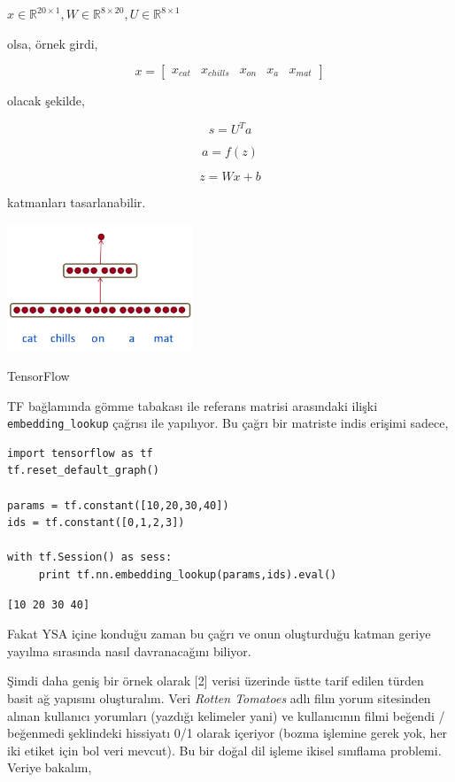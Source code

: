 \documentclass[12pt,fleqn]{article}\usepackage{../../common}
\begin{document}
$x \in \mathbb{R}^{20 \times 1}, 
W \in \mathbb{R}^{8 \times 20}, 
U \in \mathbb{R}^{8 \times 1}$ 

olsa, örnek girdi,

$$ x = \left[\begin{array}{rrrrr}
x_{cat} & x_{chills} & x_{on} & x_{a} & x_{mat}
\end{array}\right]$$

olacak şekilde, 

$$ s = U^T a$$

$$ a = f(z)$$

$$ z = Wx + b$$

katmanları tasarlanabilir.

\includegraphics[width=15em]{nlp_05.png}

TensorFlow 

TF bağlamında gömme tabakası ile referans matrisi arasındaki ilişki
\verb!embedding_lookup! çağrısı ile yapılıyor. Bu çağrı bir matriste indis
erişimi sadece,

\begin{verbatim}
import tensorflow as tf
tf.reset_default_graph()

params = tf.constant([10,20,30,40])
ids = tf.constant([0,1,2,3])

with tf.Session() as sess:
     print tf.nn.embedding_lookup(params,ids).eval()
\end{verbatim}

\begin{verbatim}
[10 20 30 40]
\end{verbatim}

Fakat YSA içine konduğu zaman bu çağrı ve onun oluşturduğu katman geriye
yayılma sırasında nasıl davranacağını biliyor. 

Şimdi daha geniş bir örnek olarak [2] verisi üzerinde üstte tarif edilen
türden basit ağ yapısını oluşturalım. Veri {\em Rotten Tomatoes} adlı film
yorum sitesinden alınan kullanıcı yorumları (yazdığı kelimeler yani) ve
kullanıcının filmi beğendi / beğenmedi şeklindeki hissiyatı 0/1 olarak
içeriyor (bozma işlemine gerek yok, her iki etiket için bol veri
mevcut). Bu bir doğal dil işleme ikisel sınıflama problemi. Veriye bakalım,
\end{document}
